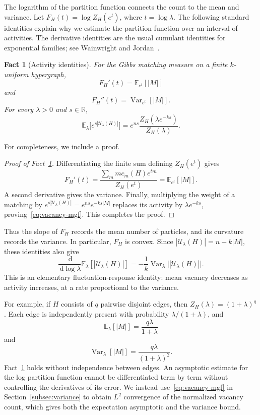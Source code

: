 \documentclass[11pt,reqno]{amsart}
\numberwithin{equation}{section}
\theoremstyle{plain}
\newtheorem{fact}[theorem]{Fact}
\theoremstyle{definition}
\newcommand{\E}{\mathbb E}
\newcommand{\Var}{\operatorname{Var}}
\newcommand{\calU}{\mathcal U}
\newcommand{\dd}{\,\mathrm d}
\begin{document}
The logarithm of the partition function connects the count to the mean and variance.
Let $F_H(t)=\log Z_H(e^t)$, where $t=\log\lambda$.
The following standard identities explain why we estimate the partition function over an interval of activities.
The derivative identities are the usual cumulant identities for exponential families; see Wainwright and Jordan~\cite[Proposition~3.1]{WainwrightJordan}.

\begin{fact}[Activity identities]\label{fact:activity}
    For the Gibbs matching measure on a finite $k$-uniform hypergraph,
    \[
        F_H'(t)=\E_{e^t}[|M|]
    \]
    and
    \[
        F_H''(t)=\Var_{e^t}[|M|].
    \]
    For every $\lambda>0$ and $s\in\mathbb R$,
    \begin{equation}\label{eq:vacancy-mgf}
        \E_\lambda\bigl[e^{s|\calU_\lambda(H)|}\bigr]
        =e^{ns}\frac{Z_H(\lambda e^{-ks})}{Z_H(\lambda)}.
    \end{equation}
\end{fact}

For completeness, we include a proof.

\begin{proof}[Proof of Fact~\ref{fact:activity}]
    Differentiating the finite sum defining $Z_H(e^t)$ gives
    \[
        F_H'(t)=\frac{\sum_m m c_m(H)e^{tm}}{Z_H(e^t)}=\E_{e^t}[|M|].
    \]
    A second derivative gives the variance.
    Finally, multiplying the weight of a matching by $e^{s|\calU_\lambda(H)|}=e^{ns}e^{-ks|M|}$ replaces its activity by $\lambda e^{-ks}$, proving~\eqref{eq:vacancy-mgf}.
    This completes the proof.
\end{proof}

Thus the slope of $F_H$ records the mean number of particles, and its curvature records the variance. In particular, $F_H$ is convex.
Since $|\calU_\lambda(H)|=n-k|M|$, these identities also give
\[
    \frac{\dd}{\dd\log\lambda}\E_\lambda[|\calU_\lambda(H)|]
    =-\frac1k\Var_\lambda\bigl[|\calU_\lambda(H)|\bigr].
\]
This is an elementary fluctuation-response identity: mean vacancy decreases as activity increases, at a rate proportional to the variance.

For example, if $H$ consists of $q$ pairwise disjoint edges, then $Z_H(\lambda)=(1+\lambda)^q$.
Each edge is independently present with probability $\lambda/(1+\lambda)$, and
\[
    \E_\lambda[|M|]=\frac{q\lambda}{1+\lambda}
\]
and
\[
    \Var_\lambda[|M|]=\frac{q\lambda}{(1+\lambda)^2}.
\]
Fact~\ref{fact:activity} holds without independence between edges.
An asymptotic estimate for the log partition function cannot be differentiated term by term without controlling the derivatives of its error.
We instead use~\eqref{eq:vacancy-mgf} in Section~\ref{subsec:variance} to obtain $L^2$ convergence of the normalized vacancy count, which gives both the expectation asymptotic and the variance bound.
\end{document}
